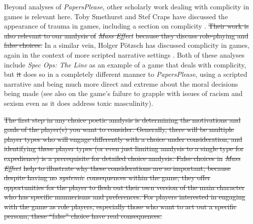 \documentclass[arts,article,submit,moreauthors,pdftex,10pt,a4paper]{Definitions/mdpi}
\providecommand{\DIFadd}[1]{{\protect\color{blue}\uwave{#1}}} %
\providecommand{\DIFdel}[1]{{\protect\color{red}\sout{#1}}}                      %
\providecommand{\DIFaddbegin}{} %
\providecommand{\DIFaddend}{} %
\providecommand{\DIFdelbegin}{} %
\providecommand{\DIFdelend}{} %
\begin{document}
Beyond analyses of \emph{Papers\DIFaddbegin \DIFadd{, }\DIFaddend Please}, other scholarly work dealing with complicity in games is relevant here.
%
Toby Smethurst and Stef Craps have discussed the appearance of trauma in games, including a section on complicity \citep{smethurst2015playing}.
%
\DIFdelbegin \DIFdel{Their work is also relevant to our analysis of }\emph{\DIFdel{Mass Effect}} %
\DIFdel{because they discuss role-playing and false choices.
}\DIFdelend In a similar vein, Holger Pötzsch has discussed complicity in games, again in the context of more scripted narrative settings \citep{potzsch2017selective}.
%
Both of these analyses include \emph{Spec Ops: The Line} \citep{yager2012spec} as an example of a game that deals with complicity, but \DIFdelbegin \DIFdel{it }\DIFdelend \DIFaddbegin \DIFadd{which }\DIFaddend does so in a completely different manner to \emph{Papers\DIFaddbegin \DIFadd{, }\DIFaddend Please}, using a scripted narrative and being much more direct and extreme about the moral decisions being made (see also \cite{murray2016race} on the game's failure to grapple with issues of racism and sexism even as it does address toxic masculinity).


\DIFdelbegin %

\DIFdel{The first step in any choice poetic analysis is determining the motivations and goals of the player(s) you want to consider.
Generally, there will be multiple player types who will engage differently with a choice under consideration, and identifying these player types (or even just limiting analysis to a single type for expedience) is a prerequisite for detailed choice analysis.
False choices in }\emph{\DIFdel{Mass Effect}} %
\DIFdel{help to illustrate why these considerations are so important, because despite having no }\emph{\DIFdel{systemic}} %
\DIFdel{consequences within the game, they offer opportunities for the player to flesh out their own version of the main character who has specific mannerisms and preferences.
For players interested in engaging with the game as role players, especially those who want to act out a specific persona, these ``false'' choice have real consequences.
}%
\end{document}
